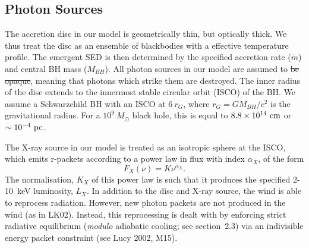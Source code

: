 \documentclass[preprint, a4paper, 11pt]{aastex}
\providecommand{\DIFadd}[1]{{\protect\color{blue}\uwave{#1}}} %
\providecommand{\DIFdel}[1]{{\protect\color{red}\sout{#1}}}                      %
\providecommand{\DIFaddbegin}{} %
\providecommand{\DIFaddend}{} %
\providecommand{\DIFdelbegin}{} %
\providecommand{\DIFdelend}{} %
\begin{document}
\DIFaddbegin 


\DIFaddend \subsection{Photon Sources}

\DIFaddbegin 

\DIFaddend The accretion disc in our model is geometrically thin, but optically thick.
We thus treat the disc as an ensemble of blackbodies with a 
\cite{shakurasunyaev1973} effective temperature profile. 
The emergent SED is then determined by the specified accretion rate ($\dot{m}$)
and central BH mass ($M_{BH}$).
All photon sources in our model are assumed to \DIFdelbegin \DIFdel{be opaque}\DIFdelend \DIFaddbegin \DIFadd{beopaque}\DIFaddend , meaning
that photons which strike them are destroyed.
The inner radius of the disc extends to the innermost 
stable circular orbit (ISCO) of the BH. 
We assume a Schwarzchild BH with an ISCO at $6~r_G$, where 
$r_G = GM_{BH}/c^2$ is the gravitational radius.
For a $10^9~M_\odot$ black hole, this is equal to $8.8\times10^{14}~{\rm cm}$ 
or $\sim10^{-4}~{\rm pc}$.  


The X-ray source in our model is treated as an isotropic sphere at the ISCO,
which emits r-packets according to a power law in flux with index $\alpha_X$, of the form
\begin{equation}
F_X (\nu) = K \nu^{\alpha_X}.
\end{equation}
The normalisation, $K_X$ of this power law is such that it 
produces the specified 2-10~keV luminosity, $L_X$.
In addition to the disc and X-ray source, 
the wind is able to reprocess radiation. However, new 
photon packets are not produced in the wind (as in LK02). 
Instead, this reprocessing is dealt with by enforcing strict
radiative equilibrium ({\em modulo} adiabatic cooling; see section~2.3)
via an indivisible energy packet
constraint (see Lucy 2002, M15).

\DIFaddbegin 
\end{document}

